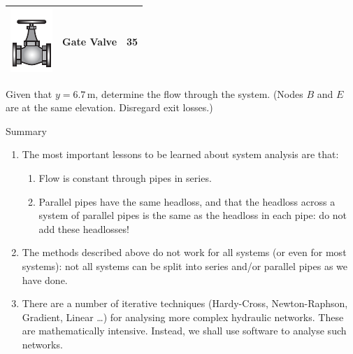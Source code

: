\documentclass[9pt,xcolor={svgnames, x11names},mathpazo, professionalfonts]{beamer}
\begin{document}
\begin{frame}{}
\begin{myexer}{}{}
{\begin{tabular}{ccc}
				\midrule
				\includegraphics[scale=0.35]{../../figs/08HWEquivPipe/gatevalve}   & Gate Valve  & 35     \\
				\bottomrule
			\end{tabular}
		}
		\hfill
		\centering\small\parb
		Given that $y=6.7\,\text{m}$, determine the flow through the system.\lb
		(Nodes $B$ and $E$ are at the same elevation. Disregard exit losses.)
	\end{myexer}
	
\end{frame}
\begin{frame}{Summary}
	\begin{enumerate}
		\item The most important lessons to be learned about system analysis are that:
		      \begin{enumerate}[a]
		      	\item Flow is constant through pipes in series.
		      	\item Parallel pipes have the same headloss, and that the headloss across a system of parallel pipes is the same as the headloss in each pipe: do not add these headlosses!
		      \end{enumerate}
		\item The methods described above do not work for all systems (or even for most systems): not all systems can be split into series and/or parallel pipes as we have done.
		\item There are a number of iterative techniques (Hardy-Cross, Newton-Raphson, Gradient, Linear \ldots ) for analysing more complex hydraulic networks. These are mathematically intensive. Instead, we shall use software to analyse such networks.
	\end{enumerate}
\end{frame}
\end{document}
